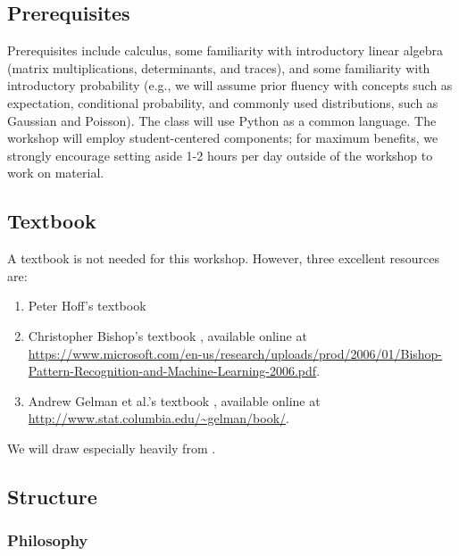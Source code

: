 \documentclass{article} %
\begin{document}
\subsection{Prerequisites} Prerequisites include calculus,  some familiarity with introductory linear algebra (matrix multiplications,  determinants,  and traces),  and some familiarity with introductory probability (e.g.,  we will assume prior fluency with concepts such as expectation,  conditional probability,  and commonly used distributions,  such as Gaussian and Poisson).    The class will use Python as a common language.     The workshop will employ student-centered components;  for maximum benefits, we strongly encourage setting aside 1-2 hours per day outside of the workshop to work on material.    %

\subsection{Textbook}

A textbook is not needed for this workshop.  However,  three excellent resources are:

\begin{enumerate}
\item Peter Hoff's textbook \cite{hoff2009first}
\item Christopher Bishop's textbook \cite{bishop2006pattern}, available online at \url{https://www.microsoft.com/en-us/research/uploads/prod/2006/01/Bishop-Pattern-Recognition-and-Machine-Learning-2006.pdf}.
\item Andrew Gelman et al.'s textbook \cite{gelman2013bayesian},  available online at \url{http://www.stat.columbia.edu/~gelman/book/}. 
\end{enumerate}

We will draw especially heavily from \cite{hoff2009first}.

\subsection{Structure}

\subsubsection{Philosophy}
\end{document}
